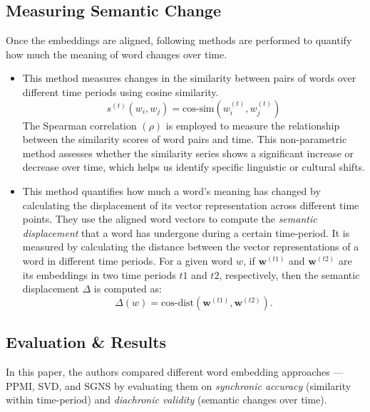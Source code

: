 \subsection{Measuring Semantic Change}\label{subsec:measuring-semantic-change}
Once the embeddings are aligned, following methods are performed to quantify how much the meaning of word changes over time.
\begin{itemize}
    \item {}
        This method measures changes in the similarity between pairs of words over different time periods using cosine similarity.
        \begin{equation}
            s^{(t)}(w_i, w_j) = \text{cos-sim}(w_i^{(t)}, w_j^{(t)})
            \label{eq:equation2}
        \end{equation}
        The Spearman correlation $(\rho)$ is employed to measure the relationship between the similarity scores of word pairs and time.
        This non-parametric method assesses whether the similarity series shows a significant increase or decrease over time, which helps us identify specific linguistic or cultural shifts.

    \item {}
        This method quantifies how much a word's meaning has changed by calculating the displacement of its vector representation across different time points.
        They use the aligned word vectors to compute the \emph{semantic displacement} that a word has undergone during a certain time-period.
        It is measured by calculating the distance between the vector representations of a word in different time periods.
        For a given word $w$, if $\mathbf{w}^{(t1)}$ and $\mathbf{w}^{(t2)}$ are its embeddings in two time periods $t1$ and $t2$, respectively, then the semantic displacement $\Delta$ is computed as:
        \begin{equation}
            \Delta(w) = \text{cos-dist}(\mathbf{w}^{(t1)}, \mathbf{w}^{(t2)}).\label{eq:equation3}
        \end{equation}
\end{itemize}

\subsection{Evaluation \& Results}\label{subsec:evaluation&results}
In this paper, the authors compared different word embedding approaches — PPMI, SVD, and SGNS  by evaluating them
on \emph{synchronic accuracy} (similarity within time-period) and \emph{diachronic validity} (semantic changes over time).

